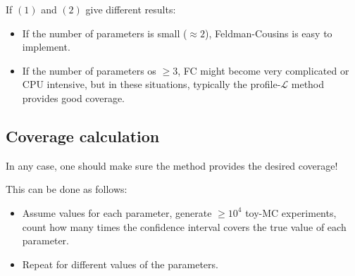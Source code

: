 If $(1)$ and $(2)$ give different results:
\begin{itemize}[$\to$]
    \item If the number of parameters is small ($\approx2$), Feldman-Cousins is easy to implement. 
    \item If the number of parameters os $\geq 3$, FC might become very complicated or CPU intensive, but in these situations, typically the profile-$\mathcal{L}$ method provides good coverage. 
\end{itemize}

\subsection{Coverage calculation}
In any case, one should make sure the method provides the desired coverage! 

This can be done as follows: 
\begin{itemize}[$\to$]
    \item Assume values for each parameter, generate $\geq 10^4$ toy-MC experiments, count how many times the confidence interval covers the true value of each parameter. 
    \item Repeat for different values of the parameters.
\end{itemize}